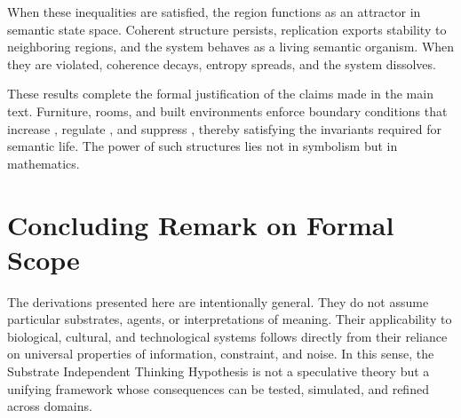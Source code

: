 \documentclass[11pt,oneside]{article}
\begin{document}
When these inequalities are satisfied, the region  functions as an attractor in semantic state space. Coherent structure persists, replication exports stability to neighboring regions, and the system behaves as a living semantic organism. When they are violated, coherence decays, entropy spreads, and the system dissolves.

These results complete the formal justification of the claims made in the main text. Furniture, rooms, and built environments enforce boundary conditions that increase , regulate , and suppress , thereby satisfying the invariants required for semantic life. The power of such structures lies not in symbolism but in mathematics.

\section{Concluding Remark on Formal Scope}

The derivations presented here are intentionally general. They do not assume particular substrates, agents, or interpretations of meaning. Their applicability to biological, cultural, and technological systems follows directly from their reliance on universal properties of information, constraint, and noise. In this sense, the Substrate Independent Thinking Hypothesis is not a speculative theory but a unifying framework whose consequences can be tested, simulated, and refined across domains.
\end{document}

